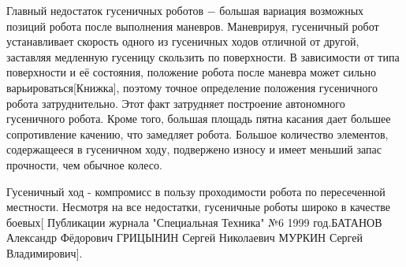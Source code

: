 \documentclass[oneside,final,14pt]{extreport}
\begin{document}
Главный недостаток гусеничных роботов $-$ большая вариация возможных позиций робота после выполнения маневров. Маневрируя, гусеничный робот устанавливает скорость одного из гусеничных ходов отличной от другой, заставляя медленную гусеницу скользить по поверхности. В зависимости от типа поверхности и её состояния, положение робота после маневра может сильно варьироваться[Книжка], поэтому точное определение положения гусеничного робота затруднительно. Этот факт затрудняет построение автономного гусеничного робота. Кроме того, большая площадь пятна касания дает большее сопротивление качению, что замедляет робота. Большое количество элементов, содержащееся в гусеничном ходу, подвержено износу и имеет меньший запас прочности, чем обычное колесо. 

Гусеничный ход - компромисс в пользу проходимости робота по пересеченной местности. Несмотря на все недостатки, гусеничные роботы широко в качестве боевых[ Публикации журнала "Специальная Техника" №6 1999 год.БАТАНОВ Александр Фёдорович
ГРИЦЫНИН Сергей Николаевич
МУРКИН Сергей Владимирович].
\end{document}
